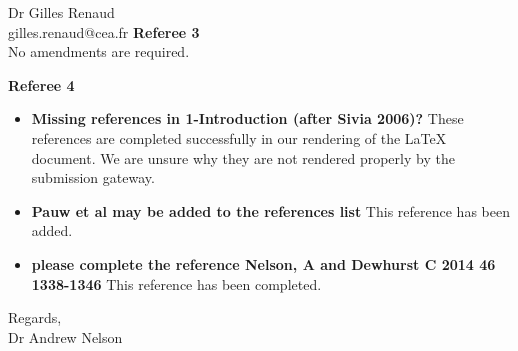\documentclass[fontsize=12pt, paper=a4]{scrlttr2}
\begin{document}
\begin{letter}{Dr Gilles Renaud \\ gilles.renaud@cea.fr}
\vskip12pt
\noindent
\textbf{Referee 3} \\
No amendments are required.


\vskip12pt
\noindent
\textbf{Referee 4}
\begin{itemize}
\item \textbf{Missing references in 1-Introduction (after Sivia 2006)?} These references are completed successfully in our rendering of the \LaTeX{} document. We are unsure why they are not rendered properly by the submission gateway.
\item \textbf{Pauw et al may be added to the references list} This reference has been added.
\item \textbf{please complete the reference Nelson, A and Dewhurst C 2014 46 1338-1346} This reference has been completed.
\end{itemize}


\closing{Regards, \\ Dr Andrew Nelson} %

\end{letter}
\end{document}
